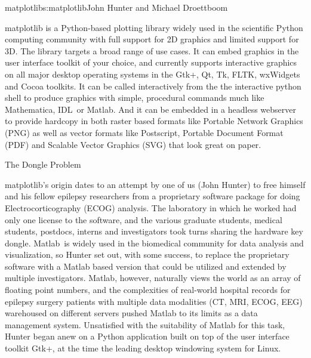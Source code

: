 \begin{aosachapter}{matplotlib}{s:matplotlib}{John Hunter and Michael Droettboom}

matplotlib is a Python-based plotting library widely used in the
scientific Python computing community with full support for 2D
graphics and limited support for 3D.  The library targets a broad
range of use cases.  It can embed graphics in the user interface
toolkit of your choice, and currently supports interactive graphics on
all major desktop operating systems in the Gtk+, Qt, Tk, FLTK,
wxWidgets and Cocoa toolkits.  It can be called interactively from the
the interactive python shell to produce graphics with simple,
procedural commands much like Mathematica\texttrademark,
IDL\texttrademark\ or Matlab\texttrademark.  And it can be embedded in
a headless webserver to provide hardcopy in both raster based formats
like Portable Network Graphics (PNG) as well as vector formats like
Postscript, Portable Document Format (PDF) and Scalable Vector
Graphics (SVG) that look great on paper.

\begin{aosasect1}{The Dongle Problem}

matplotlib's origin dates to an attempt by one of us (John Hunter) to
free himself and his fellow epilepsy researchers from a proprietary
software package for doing Electrocorticography (ECOG) analysis.  The
laboratory in which he worked had only one license to the software,
and the various graduate students, medical students, postdocs, interns
and investigators took turns sharing the hardware key dongle.
Matlab\texttrademark\ is widely used in the biomedical community for
data analysis and visualization, so Hunter set out, with some success,
to replace the proprietary software with a Matlab based version that
could be utilized and extended by multiple investigators.  Matlab,
however, naturally views the world as an array of floating point
numbers, and the complexities of real-world hospital records for
epilepsy surgery patients with multiple data modalities (CT, MRI,
ECOG, EEG) warehoused on different servers pushed Matlab to its limits
as a data management system.  Unsatisfied with the suitability of
Matlab for this task, Hunter began anew on a Python application built
on top of the user interface toolkit Gtk+, at the time the leading
desktop windowing system for Linux.


\end{aosasect1}
\end{aosachapter}
